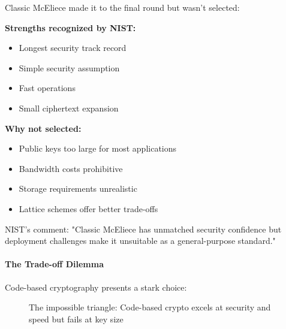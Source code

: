 \documentclass[11pt,a4paper]{article}
\begin{document}
Classic McEliece made it to the final round but wasn't selected:

\textbf{Strengths recognized by NIST:}
\begin{itemize}
    \item Longest security track record
    \item Simple security assumption
    \item Fast operations
    \item Small ciphertext expansion
\end{itemize}

\textbf{Why not selected:}
\begin{itemize}
    \item Public keys too large for most applications
    \item Bandwidth costs prohibitive
    \item Storage requirements unrealistic
    \item Lattice schemes offer better trade-offs
\end{itemize}

NIST's comment: "Classic McEliece has unmatched security confidence but deployment challenges make it unsuitable as a general-purpose standard."

\paragraph{The Trade-off Dilemma}

Code-based cryptography presents a stark choice:

\begin{figure}[h]
\centering
{}
\caption{The impossible triangle: Code-based crypto excels at security and speed but fails at key size}
\end{figure}
\end{document}
